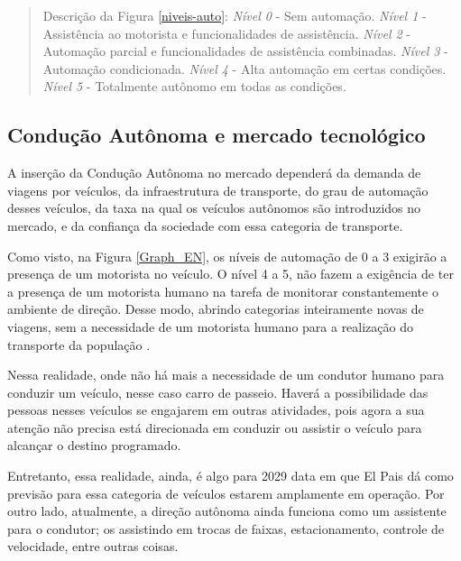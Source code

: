\begin{quote}
Descrição da Figura \ref{niveis-auto}:  \textit{Nível 0} - Sem automação.  \textit{Nível 1} - Assistência ao motorista e funcionalidades de assistência.  \textit{Nível 2} - Automação parcial e funcionalidades de assistência combinadas.  \textit{Nível 3} - Automação condicionada.  \textit{Nível 4} - Alta automação em certas condições.  \textit{Nível 5} - Totalmente autônomo em todas as condições. 
\end{quote}



\subsection{Condução Autônoma e mercado tecnológico}

A inserção da Condução Autônoma no mercado dependerá da demanda de viagens por veículos, da infraestrutura de transporte, do grau de automação desses veículos, da taxa na qual os veículos autônomos são introduzidos no mercado, e da confiança da sociedade com essa categoria de transporte. 

Como visto, na Figura \ref{Graph_EN}, os níveis de automação de 0 a 3 exigirão a presença de um motorista no veículo. O nível 4 a 5, não fazem a exigência de ter a presença de um motorista humano na tarefa de monitorar constantemente o ambiente de direção. 
Desse modo, abrindo categorias inteiramente novas de viagens, sem a necessidade de um motorista humano para a realização do transporte da população \cite{notif}.

Nessa realidade, onde não há mais a necessidade de um condutor humano para conduzir um veículo, nesse caso carro de passeio. Haverá a possibilidade das pessoas nesses veículos se engajarem em outras atividades, pois agora a sua atenção não precisa está direcionada em conduzir ou assistir o veículo para alcançar o destino programado. 


Entretanto, essa realidade, ainda, é algo para 2029 \cite{elpais} data em que El Pais dá como previsão para essa categoria de veículos estarem amplamente em operação. Por outro lado, atualmente, a direção autônoma ainda funciona como um assistente para o condutor; os assistindo em trocas de faixas, estacionamento, controle de velocidade, entre outras coisas. 

